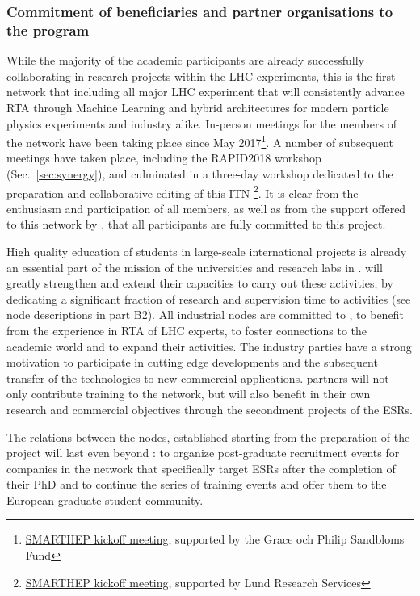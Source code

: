 \subsubsection{Commitment of beneficiaries and partner organisations to the program}

While the majority of the \acronym academic participants are already successfully collaborating in research projects within the LHC experiments, this is the first network that including all major LHC experiment that will consistently advance RTA through Machine Learning and hybrid architectures for modern particle physics experiments and industry alike. 
In-person meetings for the members of the \acronym network have been taking place since May 2017\footnote{\href{https://indico.lucas.lu.se/event/656/}{SMARTHEP kickoff meeting}, supported by the Grace och Philip Sandbloms Fund}. A number of subsequent meetings have taken place, including the RAPID2018 workshop (Sec.~\ref{sec:synergy}), and culminated in a three-day workshop dedicated to the preparation and collaborative editing of this ITN \footnote{\href{https://indico.lucas.lu.se/event/656/}{SMARTHEP kickoff meeting}, supported by Lund Research Services}. 
It is clear from the enthusiasm and participation of all members, as well as from the support offered to this network by \lundentity, that all \acronym participants are fully committed to this project.

High quality education of students in large-scale international projects is already an essential part of the mission of the universities and research labs in \acronym. 
\acronym will greatly strengthen and extend their capacities to carry out these activities, by dedicating a significant fraction of research and supervision time to \acronym activities (see node descriptions in part B2).
All industrial nodes are committed to \acronym, to benefit from the experience in RTA of LHC experts, to foster connections to the academic world and to expand their activities. 
The industry parties have a strong motivation to participate in cutting edge developments and the subsequent transfer of the technologies to new commercial applications.
\acronym partners will not only contribute training to the network, but will also benefit in their own research and commercial objectives through the secondment projects of the ESRs. 

The relations between the nodes, established starting from the preparation of the project will last even beyond \acronym: 
to organize post-graduate recruitment events for companies in the network that specifically target \acronym ESRs after the completion of their PhD and to continue the series of training events and offer them to the European graduate student community.  


